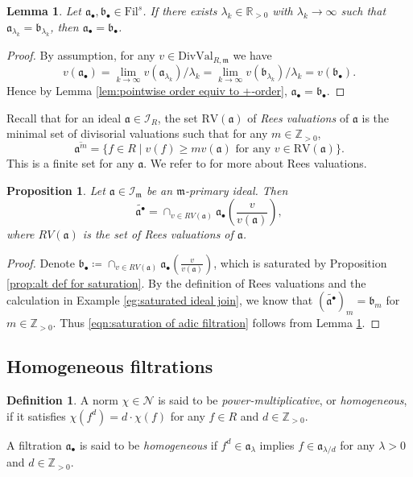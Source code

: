 \documentclass[11pt, leqno]{amsart}%
\theoremstyle{plain}
\newtheorem{lemma}[theorem]{Lemma}
\newtheorem{proposition}[theorem]{Proposition}
\theoremstyle{definition}
\newtheorem{defn}[theorem]{Definition}
\theoremstyle{remark}
\newcommand{\cN}{\mathcal{N}}
\newcommand{\cI}{\mathcal{I}}
\newcommand{\bR}{\mathbb{R}}
\newcommand{\bZ}{\mathbb{Z}}
\newcommand{\fa}{\mathfrak{a}}
\newcommand{\fb}{\mathfrak{b}}
\newcommand{\fm}{\mathfrak{m}}
\newcommand{\DivVal}{\mathrm{DivVal}}
\newcommand{\RV}{\mathrm{RV}}
\newcommand{\Fil}{\mathrm{Fil}}
\numberwithin{equation}{section}
\begin{document}
\begin{lemma}\label{lem:test equality}
    Let $\fa_\bullet,\fb_\bullet\in\Fil^s$. If there exists $\lambda_k\in\bR_{>0}$ with $\lambda_k\to\infty$ such that $\fa_{\lambda_k}=\fb_{\lambda_k}$, then $\fa_\bullet=\fb_\bullet$.
\end{lemma}

\begin{proof}
    By assumption, for any $v\in\DivVal_{R,\fm}$ we have 
    \[
        v(\fa_\bullet)= \lim_{k\to\infty} v(\fa_{\lambda_k})/\lambda_k=\lim_{k\to\infty} v(\fb_{\lambda_k})/\lambda_k=v(\fb_\bullet).
    \]
    Hence by Lemma \ref{lem:pointwise order equiv to +-order}, $\fa_\bullet=\fb_\bullet$. 
\end{proof}

Recall that for an ideal $\fa\in\cI_R$, the set $\RV(\fa)$ of \emph{Rees valuations} of $\fa$ is the minimal set of divisorial valuations such that for any $m\in\bZ_{>0}$, 
\[
    \overline{\fa^m}=\{f\in R\mid v(f)\ge mv(\fa) \text{ for any } v\in\RV(\fa)\}.
\]
This is a finite set for any $\fa$. We refer to \cite[Chapter 10]{HS06} for more about Rees valuations.
\begin{proposition}\label{prop:saturation and Rees}
    Let $\fa\in\cI_\fm$ be an $\fm$-primary ideal. Then
    \begin{equation}\label{eqn:saturation of adic filtration}
        \widetilde{\fa^\bullet}=
        \cap_{v\in RV(\fa)}\fa_\bullet(\frac{v}{v(\fa)}),
    \end{equation}
    where $RV(\fa)$ is the set of Rees valuations of $\fa$.
\end{proposition}

\begin{proof}
    Denote $\fb_\bullet\coloneqq \cap_{v\in RV(\fa)}\fa_\bullet(\frac{v}{v(\fa)})$, which is saturated by Proposition \ref{prop:alt def for saturation}. By the definition of Rees valuations and the calculation in Example \ref{eg:saturated ideal join}, we know that $(\widetilde{\fa^\bullet})_m=\fb_m$ for $m\in\bZ_{>0}$. Thus \eqref{eqn:saturation of adic filtration} follows from Lemma \ref{lem:test equality}.
\end{proof}



\subsection{Homogeneous filtrations}\label{ssec:homogeneous}

\begin{defn}\label{defn:homogeneity}
    A norm $\chi\in\cN$ is said to be \emph{power-multiplicative}, or \emph{homogeneous}, if it satisfies $\chi(f^d)=d\cdot \chi(f)$ for any $f\in R$ and $d\in\bZ_{>0}$.
	
    A filtration $\fa_\bullet$ is said to be \emph{homogeneous} if $f^d\in\fa_\lambda$ implies $f\in\fa_{\lambda/d}$ for any $\lambda>0$ and $d\in\bZ_{>0}$. 
\end{defn}
\end{document}
